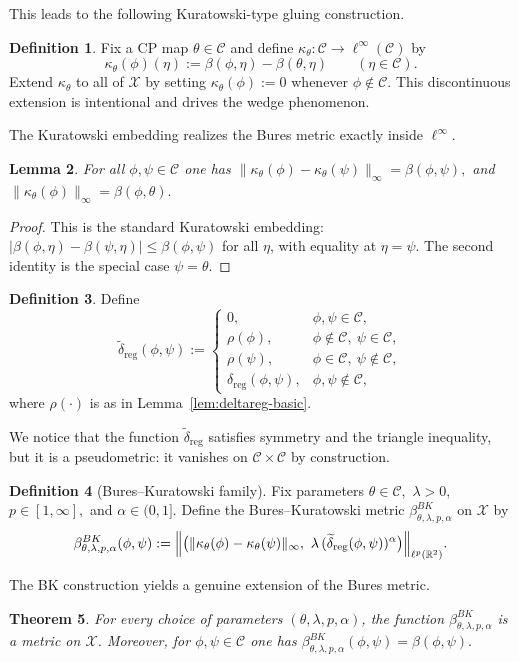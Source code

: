 \documentclass[11pt]{amsart}
\newtheorem{theorem}{Theorem}[section]
\newtheorem{lemma}[theorem]{Lemma}
\theoremstyle{definition}
\newtheorem{definition}[theorem]{Definition}
\theoremstyle{remark}
\newcommand{\R}{\mathbb R}
\newcommand{\1}{\mathbbm{1}}
\begin{document}
This leads to the following Kuratowski-type gluing construction.

\begin{definition}
Fix a CP map $\theta\in \mathcal C$ and define $\kappa_\theta:\mathcal C\to \ell^\infty(\mathcal C)$ by
\[
\kappa_\theta(\phi)(\eta):=\beta(\phi,\eta)-\beta(\theta,\eta)\qquad(\eta\in \mathcal C).
\]
Extend $\kappa_\theta$ to all of $\mathcal X$ by setting $\kappa_\theta(\phi):=0$ whenever $\phi\notin \mathcal C$. This discontinuous extension is intentional and drives the wedge phenomenon.
\end{definition}
The Kuratowski embedding realizes the Bures metric exactly inside $\ell^\infty$.
\begin{lemma}\label{lem:kuratowski-isometry-anchor}
For all $\phi,\psi\in \mathcal C$ one has $\|\kappa_\theta(\phi)-\kappa_\theta(\psi)\|_\infty=\beta(\phi,\psi),$ and 
$\|\kappa_\theta(\phi)\|_\infty=\beta(\phi,\theta).$
\end{lemma}

\begin{proof}
This is the standard Kuratowski embedding: $|\beta(\phi,\eta)-\beta(\psi,\eta)|\le \beta(\phi,\psi)$ for all $\eta$,
with equality at $\eta=\psi$. The second identity is the special case $\psi=\theta$.
\end{proof}
\begin{definition}
Define 
\[
\widetilde\delta_{\mathrm{reg}}(\phi,\psi):=
\begin{cases}
0,& \phi,\psi\in \mathcal C,\\
\rho(\phi),& \phi\notin\mathcal C,\ \psi\in \mathcal C,\\
\rho(\psi),& \phi\in\mathcal C,\ \psi\notin \mathcal C,\\
\delta_{\mathrm{reg}}(\phi,\psi),& \phi,\psi\notin \mathcal C,
\end{cases}
\]
where $\rho(\cdot)$ is as in Lemma~\ref{lem:deltareg-basic}.
\end{definition}
We notice that the function $\widetilde\delta_{\mathrm{reg}}$ satisfies symmetry and the triangle inequality, but it is a pseudometric:
it vanishes on $\mathcal C\times \mathcal C$ by construction.

\begin{definition}[Bures--Kuratowski family]\label{def:BK-family}
Fix parameters $\theta\in \mathcal C,$ $\lambda>0,$ $p\in[1,\infty],$ and $\alpha\in(0,1].$
Define the Bures--Kuratowski metric $\beta^{BK}_{\theta,\lambda,p,\alpha}$ on $\mathcal X$ by
\[
\beta^{BK}_{\theta,\lambda,p,\alpha}(\phi,\psi)
:=
\Bigl\|\bigl(
\|\kappa_\theta(\phi)-\kappa_\theta(\psi)\|_\infty,\ 
\lambda\,(\widetilde\delta_{\mathrm{reg}}(\phi,\psi))^\alpha
\bigr)\Bigr\|_{\ell^p(\R^2)}.
\]
\end{definition}
The BK construction yields a genuine extension of the Bures metric.
\begin{theorem}
\label{prop:BK-metric}
For every choice of parameters $(\theta,\lambda,p,\alpha)$, the function $\beta^{BK}_{\theta,\lambda,p,\alpha}$ is a metric on $\mathcal X$.
Moreover, for $\phi,\psi\in \mathcal C$ one has $\beta^{BK}_{\theta,\lambda,p,\alpha}(\phi,\psi)=\beta(\phi,\psi).$
\end{theorem}
\end{document}
